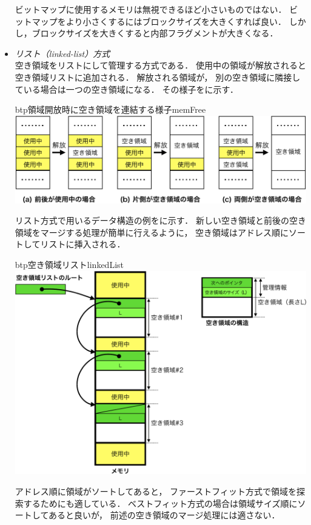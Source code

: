 \begin{itemize}
  ビットマップに使用するメモリは無視できるほど小さいものではない．
  ビットマップをより小さくするにはブロックサイズを大きくすれば良い．
  しかし，ブロックサイズを大きくすると内部フラグメントが大きくなる．

\item \emph{リスト（linked-list）方式}\\
  空き領域をリストにして管理する方式である．
  使用中の領域が解放されると空き領域リストに追加される．
  解放される領域が，
  別の空き領域に隣接している場合は一つの空き領域になる．
  その様子をに示す．

  \begin{myfig}{btp}{領域開放時に空き領域を連結する様子}{memFree}
    \includegraphics[scale=0.74]{Fig/memFree-crop.pdf}
  \end{myfig}

  リスト方式で用いるデータ構造の例をに示す．
  新しい空き領域と前後の空き領域をマージする処理が簡単に行えるように，
  空き領域はアドレス順にソートしてリストに挿入される．

  \begin{myfig}{btp}{空き領域リスト}{linkedList}
    \includegraphics[scale=0.6]{Fig/linkedList-crop.pdf}
  \end{myfig}

  アドレス順に領域がソートしてあると，
  ファーストフィット方式で領域を探索するためにも適している．
  ベストフィット方式の場合は領域サイズ順にソートしてあると良いが，
  前述の空き領域のマージ処理には適さない．
\end{itemize}

